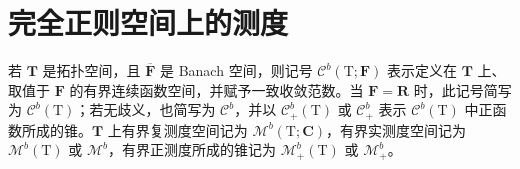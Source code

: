 \section{完全正则空间上的测度}

若 \(\mathbf{T}\) 是拓扑空间，且 \(\overline{\mathbf{F}}\) 是 Banach 空间，则记号 \(\mathcal{C}^b (\mathrm{T};\mathbf{F})\) 表示定义在 \(\mathbf{T}\) 上、取值于 \(\mathbf{F}\) 的有界连续函数空间，并赋予一致收敛范数。当 \(\mathbf{F} = \mathbf{R}\) 时，此记号简写为 \(\mathcal{C}^b (\mathrm{T})\)；若无歧义，也简写为 \(\mathcal{C}^b\)，并以 \(\mathcal{C}_+^b (\mathrm{T})\) 或 \(\mathcal{C}_+^b\) 表示 \(\mathcal{C}^b (\mathrm{T})\) 中正函数所成的锥。\(\mathbf{T}\) 上有界复测度空间记为 \(\mathcal{M}^b (\mathrm{T};\mathbf{C})\)，有界实测度空间记为 \(\mathcal{M}^b (\mathrm{T})\) 或 \(\mathcal{M}^b\)，有界正测度所成的锥记为 \(\mathcal{M}_+^b (\mathrm{T})\) 或 \(\mathcal{M}_+^b\)。

